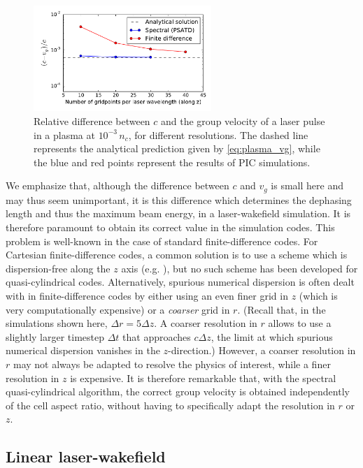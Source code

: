 \documentclass[1p,times]{elsarticle}
\begin{document}
\begin{figure}[!h]
\centering
\includegraphics[width=0.6\textwidth]{Plasma_vg.pdf}
\caption{\label{fig:Plasma_vg}Relative difference between $c$ and the
group velocity of a laser pulse in a plasma at $10^{-3}\,n_c$, for different
resolutions. The dashed line represents
the analytical prediction given by \cref{eq:plasma_vg}, while the blue
and red points represent the results of PIC simulations.}
\end{figure}

We emphasize that, although the difference between $c$ and $v_g$ is
small here and may thus seem unimportant, it is this difference which determines
the dephasing length and thus the
maximum beam energy, in a laser-wakefield simulation. It is therefore
paramount to obtain its correct value in the simulation codes. This
problem is well-known in the case of standard finite-difference
codes. For Cartesian finite-difference codes, a common solution is to
use a scheme which is dispersion-free along the $z$ axis 
(e.g. \cite{Karkkainen,Pukhov,Nuter}), but no such scheme has been
developed for quasi-cylindrical codes. Alternatively, spurious
numerical dispersion is often 
dealt with in finite-difference codes by either using an even finer grid in
$z$ (which is very computationally expensive) or
a \emph{coarser} grid in $r$. (Recall that, in the simulations shown
here, $\Delta r = 5\Delta z$. A coarser resolution in $r$ allows to
use a slightly larger timestep $\Delta t$ that approaches $c\Delta z$, the limit 
at which spurious numerical dispersion vanishes in the $z$-direction.) 
However, a coarser resolution in $r$ may not always be
adapted to resolve the physics of interest, while a finer resolution in $z$ 
is expensive. It is therefore remarkable 
that, with the spectral quasi-cylindrical algorithm, the correct group
velocity is obtained independently of the cell aspect ratio, without having to 
specifically adapt the resolution in $r$ or $z$.

\subsection{Linear laser-wakefield}
\end{document}
